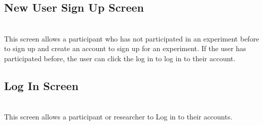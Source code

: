 \subsection{New User Sign Up Screen}
\\
This screen allows a participant who has not participated in an experiment before to sign up and create an account to sign up for an experiment.  If the user has participated before, the user can click the log in to log in to their account.

\subsection{Log In Screen}
\\
This screen allows a participant or researcher to Log in to their accounts.

